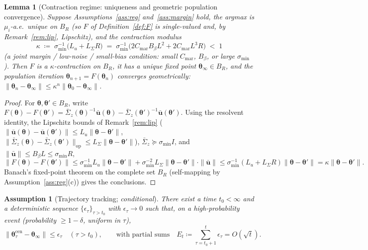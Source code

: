 \documentclass[11pt]{article}
\newtheorem{lemma}[theorem]{Lemma}
\newtheorem{assumption}[theorem]{Assumption}
\begin{document}
\begin{lemma}[Contraction regime: uniqueness and geometric
population convergence]\label{lem:contraction}
Suppose Assumptions~\ref{ass:reg} and~\ref{ass:margin} hold, the
argmax is $\mu_i$-a.e.\ unique on $B_R$ (so $F$ of
Definition~\ref{def:F} is single-valued and, by
Remark~\ref{rem:lip}, Lipschitz), and the contraction modulus
\begin{equation}
\kappa\;\coloneqq\;\sigma_{\min}^{-1}\bigl(L_u+L_\Sigma R\bigr)
\;=\;\sigma_{\min}^{-1}\bigl(2C_{\mathrm{mar}}B_\beta L^2
+2C_{\mathrm{mar}}L^3 R\bigr)\;<\;1
\label{eq:kappa}
\end{equation}
(a joint margin / low-noise / small-bias condition: small
$C_{\mathrm{mar}}$, $B_\beta$, or large $\sigma_{\min}$).  Then $F$ is a
$\kappa$-contraction on $B_R$, it has a \emph{unique} fixed point
$\bm{\theta}_\infty\in B_R$, and the population iteration
$\bm{\theta}_{n+1}=F(\bm{\theta}_n)$ converges geometrically:
$\|\bm{\theta}_n-\bm{\theta}_\infty\|\leq\kappa^n\|\bm{\theta}_0-\bm{\theta}_\infty\|$.
\end{lemma}

\begin{proof}
For $\bm{\theta},\bm{\theta}'\in B_R$, write
$F(\bm{\theta})-F(\bm{\theta}')
=\bar{\Sigma}_z(\bm{\theta})^{-1}\bar{\bm{u}}(\bm{\theta})
-\bar{\Sigma}_z(\bm{\theta}')^{-1}\bar{\bm{u}}(\bm{\theta}')$.
Using the resolvent identity, the Lipschitz bounds of
Remark~\ref{rem:lip}
($\|\bar{\bm{u}}(\bm{\theta})-\bar{\bm{u}}(\bm{\theta}')\|\leq
L_u\|\bm{\theta}-\bm{\theta}'\|$,
$\|\bar{\Sigma}_z(\bm{\theta})-\bar{\Sigma}_z(\bm{\theta}')\|_{\mathrm{op}}
\leq L_\Sigma\|\bm{\theta}-\bm{\theta}'\|$),
$\bar{\Sigma}_z\succeq\sigma_{\min}I$, and
$\|\bar{\bm{u}}\|\leq B_\beta L\leq\sigma_{\min}R$,
\[
\|F(\bm{\theta})-F(\bm{\theta}')\|
\leq\sigma_{\min}^{-1}L_u\|\bm{\theta}-\bm{\theta}'\|
+\sigma_{\min}^{-2}L_\Sigma\|\bm{\theta}-\bm{\theta}'\|\cdot\|\bar{\bm{u}}\|
\leq\sigma_{\min}^{-1}(L_u+L_\Sigma R)\|\bm{\theta}-\bm{\theta}'\|
=\kappa\|\bm{\theta}-\bm{\theta}'\|.
\]
Banach's fixed-point theorem on the complete set $B_R$ (self-mapping by
Assumption~\ref{ass:reg}(c)) gives the conclusions.
\end{proof}

\begin{assumption}[Trajectory tracking; \emph{conditional}]\label{ass:pol_conv}
There exist a time $t_0<\infty$ and a deterministic sequence
$\{\epsilon_\tau\}_{\tau>t_0}$ with $\epsilon_\tau\to 0$ such that, on a
high-probability event (probability $\geq 1-\delta$, uniform in $\tau$),
\[
\|\bm{\theta}_\tau^{\mathrm{cen}}-\bm{\theta}_\infty\|\leq\epsilon_\tau
\quad(\tau>t_0),
\qquad\text{with partial sums}\quad
E_t\coloneqq\sum_{\tau=t_0+1}^t\epsilon_\tau=O(\sqrt{t}).
\]
\end{assumption}
\end{document}
